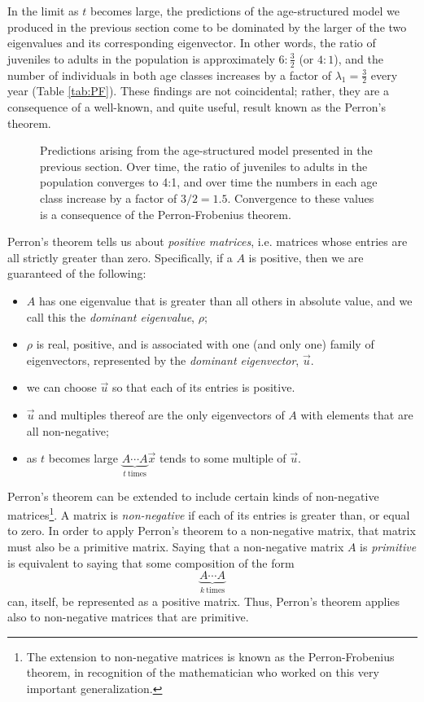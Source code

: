 \documentclass[../book.tex]{subfiles}
\begin{document}
In the limit as \(t\) becomes large, the predictions of the age-structured model we produced in the previous section come to be dominated by the larger of the two eigenvalues and its corresponding eigenvector. In other words, the ratio of juveniles to adults in the population is approximately \(6:\frac{3}{2}\) (or \(4:1\)), and the number of individuals in both age classes increases by a factor of \(\lambda_1 = \frac{3}{2}\) every year (Table \ref{tab:PF}). These findings are not coincidental; rather, they are a consequence of a well-known, and quite useful, result known as the Perron's theorem.

\begin{figure}[htbp]
  \centering
  \caption{Predictions arising from the age-structured model presented in the previous section. Over time, the ratio of juveniles to adults in the population converges to 4:1, and over time the numbers in each age class increase by a factor of \(3/2 = 1.5\). Convergence to these values is a consequence of the Perron-Frobenius theorem.}
  \label{fig:perron}
\end{figure}

Perron's theorem tells us about \emph{positive matrices}, i.e. matrices whose entries are all strictly greater than zero. Specifically, if a  \(A\) is positive, then we are guaranteed of the following:

\begin{itemize}
  \item \(A\) has one eigenvalue that is greater than all others in absolute value, and we call this the \emph{dominant eigenvalue}, \(\rho\);
  \item \(\rho\) is real, positive, and is associated with one (and only one) family of eigenvectors, represented by the \emph{dominant eigenvector}, \(\vec{u}\).
  \item we can choose \(\vec{u}\) so that each of its entries is positive.
  \item \(\vec{u}\) and multiples thereof are the only eigenvectors of \(A\) with elements that are all non-negative;
  \item as \(t\) becomes large \(\underbrace{A \cdots A}_{t\ \text{times}} \vec{x}\) tends to some multiple of \(\vec{u}\).
\end{itemize}

Perron's theorem can be extended to include certain kinds of non-negative matrices\footnote{The extension to non-negative matrices is known as the Perron-Frobenius theorem,  in recognition of the mathematician who worked on this very important generalization.}.  A matrix is \emph{non-negative} if each of its entries is greater than, or equal to zero. In order to apply Perron's theorem to a non-negative matrix, that matrix must also be a primitive matrix. Saying that a non-negative matrix \(A\) is \emph{primitive} is equivalent to saying that some composition of the form
\begin{equation}\label{eq:eig-44}
\underbrace{A\cdots A}_{k \ \text{times}}
\end{equation}
can, itself, be represented as a positive matrix. Thus, Perron's theorem applies also to non-negative matrices that are primitive.
\end{document}
